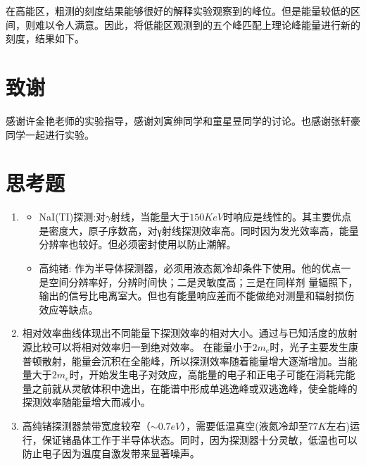 \documentclass{article}
\begin{document}
在高能区，粗测的刻度结果能够很好的解释实验观察到的峰位。但是能量较低的区间，则难以令人满意。因此，将低能区观测到的五个峰匹配上理论峰能量进行新的刻度，结果如下。

\section{致谢}
    感谢许金艳老师的实验指导，感谢刘寅绅同学和童星昱同学的讨论。也感谢张轩豪同学一起进行实验。
    \clearpage
    \appendix
    \appendixpage
    \section{思考题}
    \begin{enumerate}
        \item \begin{itemize}
            \item NaI(TI)探测:对$\gamma$射线，当能量大于$150\si{KeV}$时响应是线性的。其主要优点是密度大，原子序数高，对γ射线探测效率高。同时因为发光效率高，能量分辨率也较好。但必须密封使用以防止潮解。
            \item 高纯锗: 作为半导体探测器，必须用液态氮冷却条件下使用。他的优点一是空间分辨率好，分辨时间快；二是灵敏度高；三是在同样剂 量辐照下，输出的信号比电离室大。但也有能量响应差而不能做绝对测量和辐射损伤效应等缺点。
        \end{itemize}
        \item 相对效率曲线体现出不同能量下探测效率的相对大小。通过与已知活度的放射源比较可以将相对效率归一到绝对效率。
        在能量小于$2m_{e}$时，光子主要发生康普顿散射，能量会沉积在全能峰，所以探测效率随着能量增大逐渐增加。当能量大于$2m_{e}$时，开始发生电子对效应，高能量的电子和正电子可能在消耗完能量之前就从灵敏体积中逸出，在能谱中形成单逃逸峰或双逃逸峰，使全能峰的探测效率随能量增大而减小。
        \item 高纯锗探测器禁带宽度较窄（$\sim 0.7\si{eV}$），需要低温真空(液氮冷却至$77\si{K}$左右)运
        行，保证锗晶体工作于半导体状态。同时，因为探测器十分灵敏，低温也可以防止电子因为温度自激发带来显著噪声。 
    \end{enumerate}
\end{document}
